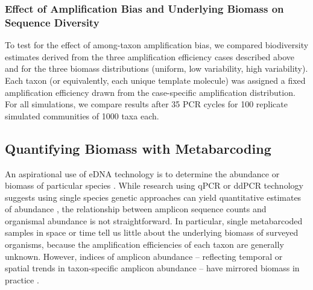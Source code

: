\documentclass[fleqn,11pt,lineno]{wlscirep}
\begin{document}
\subsubsection*{Effect of Amplification Bias and Underlying Biomass on Sequence Diversity}

To test for the effect of among-taxon amplification bias, we compared biodiversity estimates derived from the three amplification efficiency cases described above and for the three biomass distributions (uniform, low variability, high variability). Each taxon (or equivalently, each unique template molecule) was assigned a fixed amplification efficiency drawn from the case-specific amplification distribution.  For all simulations, we compare results after 35 PCR cycles for 100 replicate simulated communities of 1000 taxa each.

\subsection*{Quantifying Biomass with Metabarcoding}

An aspirational use of eDNA technology is to determine the abundance or biomass of particular species \cite{deagle_quantifying_2013, tillotson2018concentrations, jungbluth_measuring_2013, diaz-real_ngs_2015, lacoursiere2015quantifying}.  While research using qPCR or ddPCR technology suggests using single species genetic approaches can yield quantitative estimates of abundance \cite{shelton2019chinook, doi2015use, takahara2012estimation}, the relationship between amplicon sequence counts and organismal abundance is not straightforward. In particular, single metabarcoded samples in space or time tell us little about the underlying biomass of surveyed organisms, because the amplification efficiencies of each taxon are generally unknown.  However, indices of amplicon abundance -- reflecting temporal or spatial trends in taxon-specific amplicon abundance -- have mirrored biomass in practice \cite{port2016assessing}. 
\end{document}

